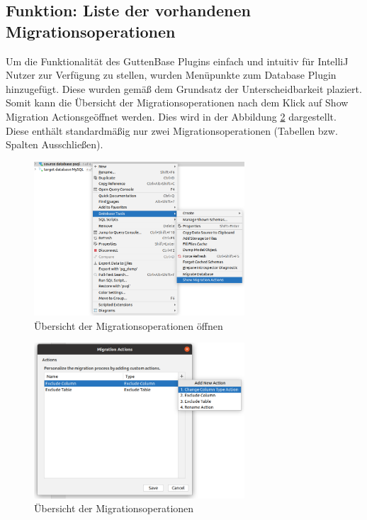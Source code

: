 \subsection{Funktion: Liste der vorhandenen Migrationsoperationen}

	Um die Funktionalität des GuttenBase Plugins einfach und intuitiv für IntelliJ Nutzer zur Verfügung zu stellen, wurden Menüpunkte zum Database Plugin hinzugefügt. Diese wurden gemäß dem Grundsatz der Unterscheidbarkeit plaziert. Somit kann die Übersicht der Migrationsoperationen nach dem Klick auf \glqq Show Migration Actions\grqq geöffnet werden. Dies wird in der Abbildung \ref{img:creategbaction} dargestellt. Diese enthält standardmäßig nur zwei Migrationsoperationen (Tabellen bzw. Spalten Ausschließen).\\ 
	\begin{figure}[h]
		\centering
		\includegraphics[width=0.7\textwidth]{images/ui/dbactions}
		\caption{Übersicht der Migrationsoperationen öffnen}
		\label{img:dbactions}
	\end{figure}
	\begin{figure}[H]
		\centering
		\includegraphics[width=0.7\textwidth]{images/ui/creategbaction}
		\caption{Übersicht der Migrationsoperationen}
		\label{img:creategbaction}
	\end{figure}


